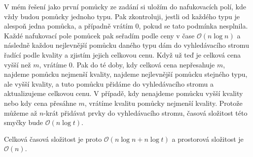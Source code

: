 \documentclass{fkssolpub}
\author{Ondřej Sedláček}
\begin{document}
V mém řešení jako první pomůcky ze zadání si uložím do nafukovacích polí, kde
vždy budou pomůcky jednoho typu. Pak zkontroluji, jestli od každého typu je alespoň
jedna pomůcka, a případně vrátím 0, pokud se tato podmínka nesplnila.
Každé nafukovací pole pomůcek pak seřadím podle ceny v čase
$\mathcal{O}(n \log n)$ a následně každou nejlevnější pomůcku daného typu dám
do vyhledávacího stromu řadící podle kvality a zjistím jejich celkovou cenu.
Když už teď je celková cena vyšší než $m$, vrátíme 0. Pak
do té doby, kdy celková cena nepřesahuje $m$, najdeme pomůcku nejmenší kvality,
najdeme nejlevnější pomůcku stejného typu, ale vyšší kvality, a tuto pomůcku
přidáme do vyhledávacího stromu a aktualizujeme celkovou cenu. V případě, kdy
nenajdeme pomůcku vyšší kvality nebo kdy cena přesáhne $m$, vrátíme kvalitu
pomůcky nejmenší kvality. Protože můžeme až $n$-krát přidávat prvky do vyhledávacího
stromu, časová složitost této smyčky bude $\mathcal{O}(n \log t)$.

Celková časová složitost je proto $\mathcal{O}(n \log n + n \log t)$ a prostorová
složitost je $\mathcal{O}(n)$.
\end{document}
